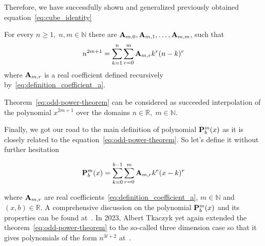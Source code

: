 Therefore, we have successfully shown and generalized previously obtained equation~\eqref{eq:cube_identity}
\begin{thm}
    For every $n\geq 1, \; n,m\in\mathbb{N}$ there are ${\mathbf{A}} \sb{m,0}, {\mathbf{A}} \sb{m,1},\dots,{\mathbf{A}} \sb{m,m}$,
    such that
    \begin{equation*}
        n^{2m+1} = \sum_{k=1}^{n}\sum_{r=0}^{m} {\mathbf{A}} \sb{m,r} k^r (n-k)^r
        \label{eq:odd-power-theorem}
    \end{equation*}
    where ${\mathbf{A}} \sb{m,r}$ is a real coefficient defined recursively by~\eqref{eq:definition_coefficient_a}.
\end{thm}
Theorem~\eqref{eq:odd-power-theorem} can be considered as succeeded interpolation of the polynomial $x^{2m+1}$
over the domains $n\in\mathbb{R}, \; m\in\mathbb{N}$.

Finally, we got our road to the main definition of polynomial ${\mathbf{P}}\sp{m} \sb{b}(x)$
as it is closely related to the equation~\eqref{eq:odd-power-theorem}.
So let's define it without further hesitation
\begin{defn}
    \begin{equation}
        {\mathbf{P}}\sp{m} \sb{b}(x) = \sum_{k=0}^{b-1} \sum_{r=0}^{m} {\mathbf{A}} \sb{m,r} k^r(x-k)^r
        \label{eq:definition_polynomial_p}
    \end{equation}
\end{defn}
where ${\mathbf{A}} \sb{m,r}$ are real coefficients~\eqref{eq:definition_coefficient_a}, $m\in\mathbb{N}$ and $(x, b)\in \mathbb{R}$.
A comprehensive discussion on the polynomial ${\mathbf{P}}\sp{m} \sb{b}(x)$ and its properties can be found at~\cite{kolosov2016link}.
In 2023, Albert Tkaczyk yet again extended the theorem~\eqref{eq:odd-power-theorem} to the so-called three dimension case
so that it gives polynomials of the form $n^{3l+2}$ at~\cite{albert_tkaczyk_2023_8371454}.
